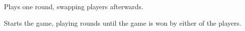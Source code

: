 \documentclass[letterpaper,10pt,english]{sphinxmanual}
\begin{document}
\begin{fulllineitems}
\begin{fulllineitems}
\label{\detokenize{neutron:neutron.NeutronGame.play_round}}
Plays one round, swapping players afterwards.

\end{fulllineitems}


\begin{fulllineitems}
\label{\detokenize{neutron:neutron.NeutronGame.start}}
Starts the game, playing rounds until the game is won by either of
the players.

\end{fulllineitems}


\end{fulllineitems}

\end{document}

